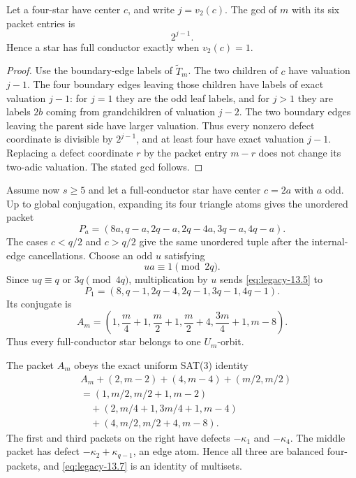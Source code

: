 \begin{manuscriptclaim}
Let a four-star have center \(c\), and write \(j=v_2(c)\). The gcd of \(m\) with its six packet entries is
\[
2^{j-1}.
\]
Hence a star has full conductor exactly when \(v_2(c)=1\).
\end{manuscriptclaim}
\begin{proof}
Use the boundary-edge labels of \(\widetilde T_m\). The two children of \(c\) have valuation \(j-1\). The four boundary edges leaving those children have labels of exact valuation \(j-1\): for \(j=1\) they are the odd leaf labels, and for \(j>1\) they are labels \(2b\) coming from grandchildren of valuation \(j-2\). The two boundary edges leaving the parent side have larger valuation. Thus every nonzero defect coordinate is divisible by \(2^{j-1}\), and at least four have exact valuation \(j-1\). Replacing a defect coordinate \(r\) by the packet entry \(m-r\) does not change its two-adic valuation. The stated gcd follows.
\end{proof}

Assume now \(s\ge5\) and let a full-conductor star have center \(c=2a\) with \(a\) odd. Up to global conjugation, expanding its four triangle atoms gives the unordered packet
\begin{equation}\label{eq:legacy-13.5}
P_a=
(8a,q-a,2q-a,2q-4a,3q-a,4q-a).\end{equation}
The cases \(c<q/2\) and \(c>q/2\) give the same unordered tuple after the internal-edge cancellations. Choose an odd \(u\) satisfying
\[
ua\equiv1\pmod{2q}.
\]
Since \(uq\equiv q\) or \(3q\pmod{4q}\), multiplication by \(u\) sends \eqref{eq:legacy-13.5} to
\[
P_1=(8,q-1,2q-4,2q-1,3q-1,4q-1).
\]
Its conjugate is
\begin{equation}\label{eq:legacy-13.6}
\boxed{
A_m=
\left(
1,\frac m4+1,\frac m2+1,\frac m2+4,
\frac{3m}4+1,m-8
\right).
}\end{equation}
Thus every full-conductor star belongs to one \(U_m\)-orbit.

The packet \(A_m\) obeys the exact uniform SAT(3) identity
\begin{equation}\label{eq:legacy-13.7}
\begin{aligned}
&A_m+(2,m-2)+(4,m-4)+(m/2,m/2)\\
&=(1,m/2,m/2+1,m-2)\\
&\quad +(2,m/4+1,3m/4+1,m-4)\\
&\quad +(4,m/2,m/2+4,m-8).
\end{aligned}\end{equation}
The first and third packets on the right have defects \(-\kappa_1\) and \(-\kappa_4\). The middle packet has defect \(-\kappa_2+\kappa_{q-1}\), an edge atom. Hence all three are balanced four-packets, and \eqref{eq:legacy-13.7} is an identity of multisets.

